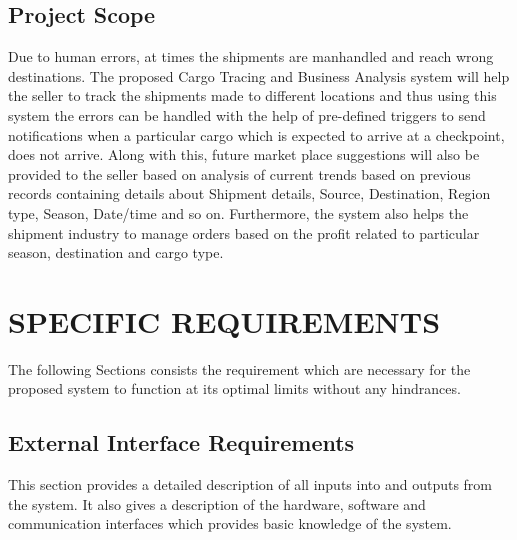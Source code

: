 \documentclass{scrreprt}
\begin{document}
 \section{Project Scope}
 
 Due to human errors, at times the shipments are manhandled and reach wrong destinations. The proposed Cargo Tracing and Business Analysis system will help the seller to track the shipments made to different locations and thus using this system the errors can be handled with the help of pre-defined triggers to send notifications when a particular cargo which is expected to arrive at a checkpoint, does not arrive. 
 Along with this, future market place suggestions will also be provided to the seller based on analysis of current trends based on previous records containing details about Shipment details, Source, Destination, Region type, Season, Date/time and so on. Furthermore, the system also helps the shipment industry to manage orders based on the profit related to particular season, destination and cargo type.
 
 \newpage

\chapter{SPECIFIC REQUIREMENTS \newline }
The following Sections consists the requirement which are necessary for the proposed system to function at its optimal limits without any hindrances.\newline 

\section{External Interface Requirements}

This section provides a detailed description of all inputs into and outputs from the system. It also gives a description of the hardware, software and communication interfaces which provides basic knowledge of the system.
\end{document}

